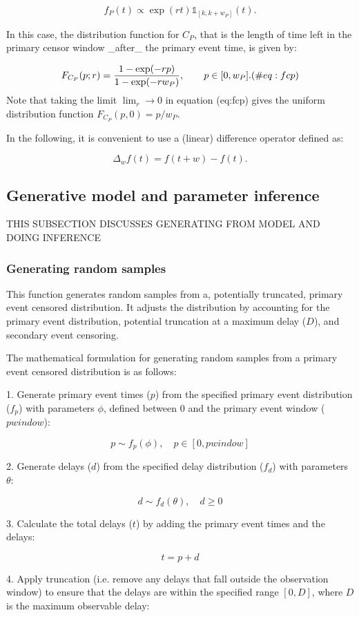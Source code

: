 \documentclass[10pt,letterpaper]{article}
\begin{document}
$$
f_P(t) \propto \exp(r t) \mathbb{1}_{[k, k + w_P]}(t).
$$

In this case, the distribution function for $C_P$, that is the length of time left in the primary censor window _after_ the primary event time, is given by:

$$
F_{C_P}(p; r) = {  1 - \exp(-r p) \over 1 - \exp(-r w_P)}, \qquad p \in [0, w_P]. (\#eq:fcp)
$$
Note that taking the limit $\lim_r \rightarrow 0$ in equation \@ref(eq:fcp) gives the uniform distribution function $F_{C_P}(p, 0) = p / w_P$.

In the following, it is convenient to use a (linear) difference operator defined as:

$$
\Delta_{w}f(t) = f(t + w) - f(t).
$$

\subsection{Generative model and parameter inference}
THIS SUBSECTION DISCUSSES GENERATING FROM MODEL AND DOING INFERENCE 
\subsubsection{Generating random samples}
This function generates random samples from a, potentially truncated, primary event censored distribution. It adjusts the distribution by accounting for the primary event distribution, potential truncation at a maximum delay ($D$), and secondary event censoring.

The mathematical formulation for generating random samples from a primary event censored distribution is as follows:

1. Generate primary event times ($p$) from the specified primary event distribution ($f_p$) with parameters $\phi$, defined between 0 and the primary event window ($pwindow$):

$$p \sim f_p(\phi), \quad p \in [0, pwindow]$$

2. Generate delays ($d$) from the specified delay distribution ($f_d$) with parameters $\theta$:

$$d \sim f_d(\theta), \quad d \geq 0$$

3. Calculate the total delays ($t$) by adding the primary event times and the delays:

$$t = p + d$$

4. Apply truncation (i.e. remove any delays that fall outside the observation window) to ensure that the delays are within the specified range $[0, D]$, where $D$ is the maximum observable delay:
\end{document}
